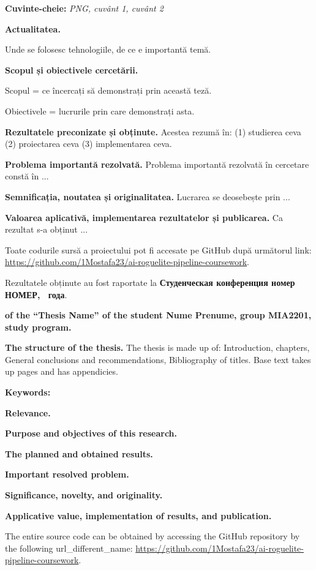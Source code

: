 \documentclass[a4paper,12pt]{report}
\newcommand{\uniGroupName}{MIA2201}
\newcommand{\authorName}{Nume Prenume}
\newcommand{\docTitleEng}{Thesis Name} %
\newcommand{\yearOfWriting}{\the\year}
\newcommand{\conferencesList}{Студенческая конференция номер НОМЕР, \yearOfWriting~года}
\newcommand{\github}{\url{https://github.com/1Mostafa23/ai-roguelite-pipeline-coursework}}
\begin{document}
\textbf{Cuvinte-cheie:}
\textit{\acrshort{PNG}, cuvânt 1, cuvânt 2}

\textbf{Actualitatea.}

Unde se folosesc tehnologiile, de ce e importantă temă.

\textbf{Scopul și obiectivele cercetării.}

Scopul = ce încercați să demonstrați prin această teză.

Obiectivele = lucrurile prin care demonstrați asta.

\textbf{Rezultatele preconizate și obținute.}
Acestea rezumă în:
(1) studierea ceva
(2) proiectarea ceva
(3) implementarea ceva.

\textbf{Problema importantă rezolvată.}
Problema importantă rezolvată în cercetare constă în ...

\textbf{Semnificația, noutatea și originalitatea.}
Lucrarea se deosebește prin ...

\textbf{Valoarea aplicativă, implementarea rezultatelor și publicarea.}
Ca rezultat s-a obținut ...

Toate codurile sursă a proiectului pot fi accesate pe GitHub după următorul link: \github.

Rezultatele obținute au fost raportate la \textbf{\conferencesList}\cite{self}.


\textbf{of the \docTypeEng{} \enquote{\docTitleEng{}} of the student \authorName{}, group \uniGroupName{}, \programulDeStudiiEng{} study program.}

\textbf{The structure of the thesis.}
The thesis is made up of: Introduction, \chapterCount{} chapters,
General conclusions and recommendations, Bibliography of \bibliographyEntryCount{} titles.
Base text takes up \usefulPageCount{} pages and has \anexeCount{} appendicies.

\textbf{Keywords:}
\textit{}

\textbf{Relevance.}

\textbf{Purpose and objectives of this research.}

\textbf{The planned and obtained results.}

\textbf{Important resolved problem.}

\textbf{Significance, novelty, and originality.}

\textbf{Applicative value, implementation of results, and publication.}

The entire source code can be obtained by accessing the GitHub repository
by the following \gls{url_different_name}: \github. 
\end{document}
